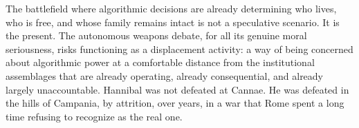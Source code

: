 \documentclass[12pt, a4paper]{article}
\begin{document}
The battlefield where algorithmic decisions are already determining who lives, who is free, and whose family remains intact is not a speculative scenario. It is the present. The autonomous weapons debate, for all its genuine moral seriousness, risks functioning as a displacement activity: a way of being concerned about algorithmic power at a comfortable distance from the institutional assemblages that are already operating, already consequential, and already largely unaccountable. Hannibal was not defeated at Cannae. He was defeated in the hills of Campania, by attrition, over years, in a war that Rome spent a long time refusing to recognize as the real one.



\end{document}
